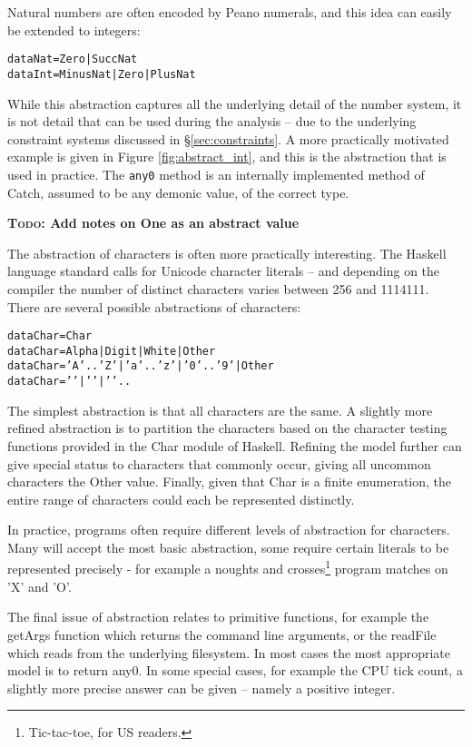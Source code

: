 \documentclass[preprint]{sigplanconf}
\newcommand{\T}[1]{\texttt{#1}}
\newcommand{\C}[1]{\textsf{#1}}
\newcommand{\todo}[1]{\textbf{\textsc{Todo:} #1}}
\newenvironment{code}{\begin{alltt}\small}{\end{alltt}}
\begin{document}
Natural numbers are often encoded by Peano numerals, and this idea can easily be extended to integers:

\begin{code}
data Nat  = Zero | Succ Nat
data Int  = Minus Nat | Zero | Plus Nat
\end{code}

While this abstraction captures all the underlying detail of the number system, it is not detail that can be used during the analysis -- due to the underlying constraint systems discussed in \S\ref{sec:constraints}. A more practically motivated example is given in Figure \ref{fig:abstract_int}, and this is the abstraction that is used in practice. The \T{any0} method is an internally implemented method of Catch, assumed to be any demonic value, of the correct type.

\todo{Add notes on One as an abstract value}

The abstraction of characters is often more practically interesting. The Haskell language standard calls for Unicode character literals -- and depending on the compiler the number of distinct characters varies between 256 and 1114111. There are several possible abstractions of characters:

\begin{code}
data Char = Char
data Char = Alpha | Digit | White | Other
data Char = 'A' .. 'Z' | 'a' .. 'z' | '0' .. '9' | Other
data Char = '\0' | '\1' | '\2' ..
\end{code}

The simplest abstraction is that all characters are the same. A slightly more refined abstraction is to partition the characters based on the character testing functions provided in the \C{Char} module of Haskell. Refining the model further can give special status to characters that commonly occur, giving all uncommon characters the \C{Other} value. Finally, given that \C{Char} is a finite enumeration, the entire range of characters could each be represented distinctly.

In practice, programs often require different levels of abstraction for characters. Many will accept the most basic abstraction, some require certain literals to be represented precisely - for example a noughts and crosses\footnote{Tic-tac-toe, for US readers.} program matches on 'X' and 'O'.

The final issue of abstraction relates to primitive functions, for example the \C{getArgs} function which returns the command line arguments, or the \C{readFile} which reads from the underlying filesystem. In most cases the most appropriate model is to return \C{any0}. In some special cases, for example the CPU tick count, a slightly more precise answer can be given -- namely a positive integer.
\end{document}

